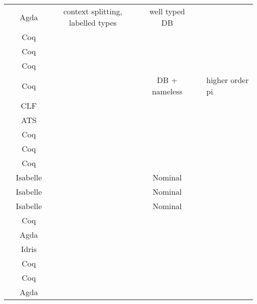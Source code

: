 \begin{center}
\begin{tabular}{l|c|c|c|c|l}
    \cite{CicconeP20}                 & Agda                   & context splitting, labelled types           & well typed DB        &             &             \\
  \cite{Castro2020}                  & Coq                    &           &         &             &             \\
  \cite{Zalakain2019}                & Coq                    &           &         &             &             \\
  \cite{Petz2016}                    & Coq                    &           &         &             &             \\
    \cite{AmbalLS21}                    & Coq                    &           & DB + nameless         &             &      higher order pi       \\
  \cite{Bock2016}                    & CLF                    &           &         &             &             \\
  \cite{Xi2016}                      & ATS                    &           &         &             &             \\
  \cite{Hirsch2022}                  & Coq                    &           &         &             &             \\
  \cite{Cruz-Filipe2021b}            & Coq                    &           &         &             &             \\
  \cite{Maksimovic2015}              & Coq                    &           &         &             &             \\
  \cite{Parrow2014}                  & Isabelle               &           & Nominal &             &             \\
  \cite{Bengtson2016}                & Isabelle               &           & Nominal &             &             \\
  \cite{Kahsai2008}                  & Isabelle               &           & Nominal &             &             \\
  \cite{Castro-Perez2021}            & Coq                    &           &         &             &             \\
  \cite{Gay2020}                     & Agda                   &           &         &             &             \\
  \cite{Brady2017}                   & Idris                  &           &         &             &             \\
  \cite{Hinrichsen2019}              & Coq                    &           &         &             &             \\
  \cite{Sergey2017}                  & Coq                    &           &         &             &             \\
  \cite{DBLP:conf/forte/ZalakainD21} & Agda                   &           &         &             & 
\end{tabular}
\end{center}

